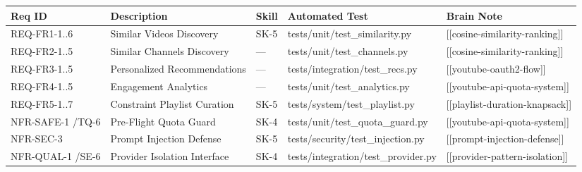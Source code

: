 \documentclass[11pt, a4paper]{article}
\begin{document}
\begin{table}[htbp]
\centering
\begin{tabularx}{\textwidth}{@{} >{\raggedright\arraybackslash\ttfamily\footnotesize}p{2.3cm} >{\raggedright\arraybackslash\small}p{2.8cm} >{\centering\arraybackslash\ttfamily\footnotesize}p{1.1cm} >{\raggedright\arraybackslash\ttfamily\footnotesize}X >{\raggedright\arraybackslash\ttfamily\footnotesize}X @{}}
\hline
\normalfont\textbf{Req ID} & \normalfont\textbf{Description} & \normalfont\textbf{Skill} & \normalfont\textbf{Automated Test} & \normalfont\textbf{Brain Note} \\
\hline
REQ-FR1-1..6 & Similar Videos Discovery & SK-5 & tests/unit/\newline test\_similarity.py & [[cosine-similarity-\newline ranking]] \\[4pt]
REQ-FR2-1..5 & Similar Channels Discovery & --- & tests/unit/\newline test\_channels.py & [[cosine-similarity-\newline ranking]] \\[4pt]
REQ-FR3-1..5 & Personalized Recommendations & --- & tests/integration/\newline test\_recs.py & [[youtube-oauth2-\newline flow]] \\[4pt]
REQ-FR4-1..5 & Engagement Analytics & --- & tests/unit/\newline test\_analytics.py & [[youtube-api-\newline quota-system]] \\[4pt]
REQ-FR5-1..7 & Constraint Playlist Curation & SK-5 & tests/system/\newline test\_playlist.py & [[playlist-duration-\newline knapsack]] \\[4pt]
NFR-SAFE-1 /\newline TQ-6 & Pre-Flight Quota Guard & SK-4 & tests/unit/\newline test\_quota\_guard.py & [[youtube-api-\newline quota-system]] \\[4pt]
NFR-SEC-3 & Prompt Injection Defense & SK-5 & tests/security/\newline test\_injection.py & [[prompt-injection-\newline defense]] \\[4pt]
NFR-QUAL-1 /\newline SE-6 & Provider Isolation Interface & SK-4 & tests/integration/\newline test\_provider.py & [[provider-pattern-\newline isolation]] \\[4pt]

\end{tabularx}
\end{table}
\end{document}
